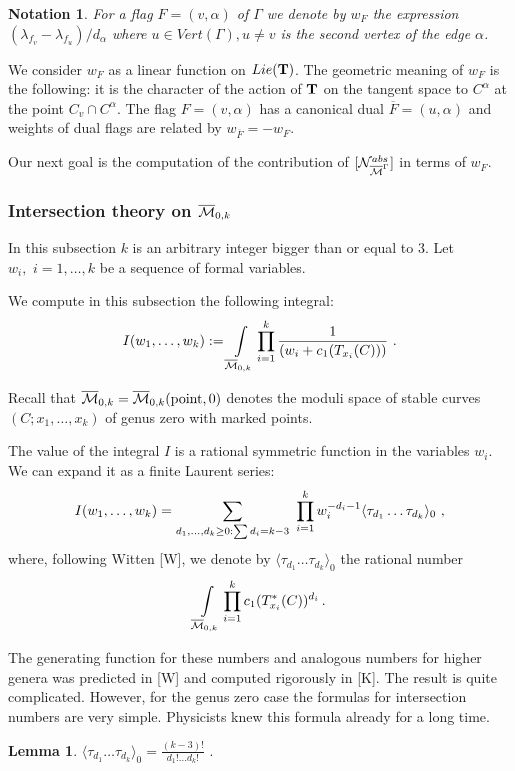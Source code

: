 \documentclass{amsart}
\newtheorem*{lem}{Lemma}
\newtheorem*{notation}{Notation}
\begin{document}
\begin{notation} For a flag $F=(v,\alpha)$ of $\Gamma$ we denote by $w_F$
the expression $(\lambda_{f_v}-\lambda_{f_u})/d_{\alpha}$ where $u\in
Vert(\Gamma),u\ne v$  is the second vertex of the edge $\alpha$.\end{notation}
   We consider $w_F$ as a linear function on $Lie(\mathbf T)$.
 The geometric meaning of $w_F$ is the following: it is the character of the
action of $\mathbf T$ on the tangent space to $C^{\alpha}$ at  the point $C_v\cap
C^{\alpha}$.  The flag $F=(v,\alpha)$ has a canonical dual
$\overline{F}=(u,\alpha)$ and  weights of dual flags are related by
$w_{\overline{F}}=-w_F$.

Our next goal is the computation of the contribution of $[\mathcal
N^{abs}_{\overline{\mathcal{M}}^{\Gamma}}]$ in terms of $w_F$.

\subsubsection{Intersection theory on $\overline{\mathcal{M}}_{0,k}$}


In this subsection
 $k$ is an arbitrary integer bigger than or equal to $3$.
 Let $w_i,\,\,i=1,\dots,k$ be a sequence of formal variables.


We compute in this subsection the following integral:
$$I(w_1,\dots,w_k):=\int\limits_{\overline{\mathcal{M}}_{0,k}}\displaystyle\prod_{i=1}^k
\frac{1}{(w_i+c_1(T_{x_i}(C)))}\,\,.$$

Recall that $\overline{\mathcal{M}}_{0,k}=\overline{\mathcal{M}}_{0,k}(\text{point},0)$ denotes the moduli space of
stable curves $(C;x_1,\dots,x_k)$ of genus zero with marked points.

The value of the integral $I$ is a rational symmetric function in the variables
$w_i$. We can expand it as a finite Laurent series:
$$I(w_1,\dots,w_k)=\displaystyle\sum_{d_1,\dots,d_k\ge0:\sum d_i =k-3}
 \,\, \prod_{i=1}^k
w_i^{-d_i-1}\langle\tau_{d_1}\dots\tau_{d_k}\rangle_0\,\,,$$
where, following Witten [W], we denote by
$\langle\tau_{d_1}\dots\tau_{d_k}\rangle_0$ the rational number
$$\int\limits_{\overline{\mathcal{M}}_{0,k}}\displaystyle\prod_{i=1}^k c_1(T^*_{x_i}(C))^{d_i}\,.$$

The generating function for these numbers and analogous numbers for higher
genera was predicted in [W] and computed rigorously in [K].
 The result is quite complicated. However,  for the genus zero case  the
formulas for intersection numbers are very simple. Physicists knew this formula
 already for a long time.


\begin{lem} $\langle\tau_{d_1}\dots\tau_{d_k}\rangle_0=\frac
{(k-3)!}{d_1!\dots d_k!}\,\,.$
\end{lem}
\end{document}
